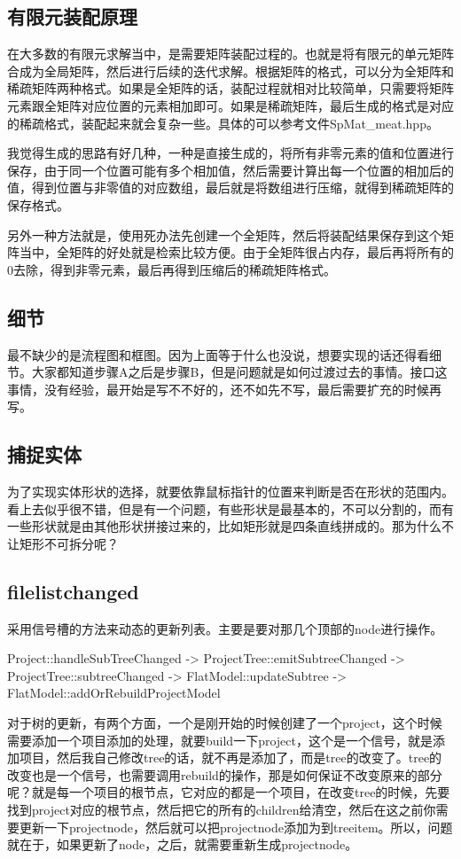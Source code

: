 \subsection{有限元装配原理}
在大多数的有限元求解当中，是需要矩阵装配过程的。也就是将有限元的单元矩阵合成为全局矩阵，然后进行后续的迭代求解。根据矩阵的格式，可以分为全矩阵和稀疏矩阵两种格式。如果是全矩阵的话，装配过程就相对比较简单，只需要将矩阵元素跟全矩阵对应位置的元素相加即可。如果是稀疏矩阵，最后生成的格式是对应的稀疏格式，装配起来就会复杂一些。具体的可以参考文件SpMat\_meat.hpp。

我觉得生成的思路有好几种，一种是直接生成的，将所有非零元素的值和位置进行保存，由于同一个位置可能有多个相加值，然后需要计算出每一个位置的相加后的值，得到位置与非零值的对应数组，最后就是将数组进行压缩，就得到稀疏矩阵的保存格式。

另外一种方法就是，使用死办法先创建一个全矩阵，然后将装配结果保存到这个矩阵当中，全矩阵的好处就是检索比较方便。由于全矩阵很占内存，最后再将所有的0去除，得到非零元素，最后再得到压缩后的稀疏矩阵格式。
\subsection{细节}
最不缺少的是流程图和框图。因为上面等于什么也没说，想要实现的话还得看细节。大家都知道步骤A之后是步骤B，但是问题就是如何过渡过去的事情。接口这事情，没有经验，最开始是写不不好的，还不如先不写，最后需要扩充的时候再写。
\subsection{捕捉实体}
为了实现实体形状的选择，就要依靠鼠标指针的位置来判断是否在形状的范围内。看上去似乎很不错，但是有一个问题，有些形状是最基本的，不可以分割的，而有一些形状就是由其他形状拼接过来的，比如矩形就是四条直线拼成的。那为什么不让矩形不可拆分呢？
\subsection{filelistchanged}
采用信号槽的方法来动态的更新列表。主要是要对那几个顶部的node进行操作。

Project::handleSubTreeChanged -> ProjectTree::emitSubtreeChanged -> ProjectTree::subtreeChanged -> FlatModel::updateSubtree -> FlatModel::addOrRebuildProjectModel

对于树的更新，有两个方面，一个是刚开始的时候创建了一个project，这个时候需要添加一个项目添加的处理，就要build一下project，这个是一个信号，就是添加项目，然后我自己修改tree的话，就不再是添加了，而是tree的改变了。tree的改变也是一个信号，也需要调用rebuild的操作，那是如何保证不改变原来的部分呢？就是每一个项目的根节点，它对应的都是一个项目，在改变tree的时候，先要找到project对应的根节点，然后把它的所有的children给清空，然后在这之前你需要更新一下projectnode，然后就可以把projectnode添加为到treeitem。所以，问题就在于，如果更新了node，之后，就需要重新生成projectnode。

